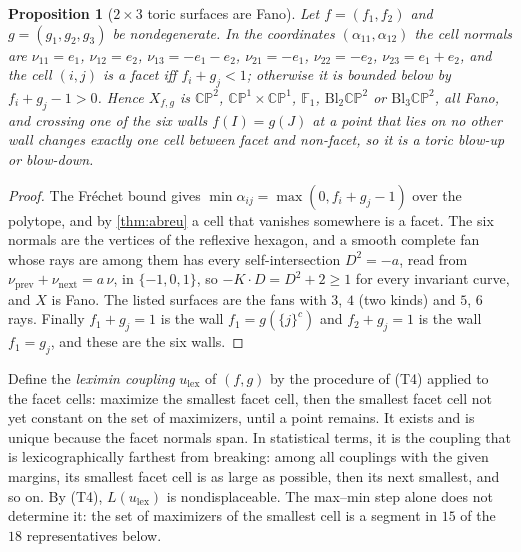 \documentclass[11pt]{article}
\newtheorem{proposition}[theorem]{Proposition}
\theoremstyle{definition}
\theoremstyle{remark}
\begin{document}
\begin{proposition}[$2\times3$ toric surfaces are Fano]\label{prop:fano23}
Let $f=(f_1,f_2)$ and $g=(g_1,g_2,g_3)$ be nondegenerate. In the coordinates $(\alpha_{11},\alpha_{12})$ the cell normals are
$\nu_{11}=e_1$, $\nu_{12}=e_2$, $\nu_{13}=-e_1-e_2$, $\nu_{21}=-e_1$, $\nu_{22}=-e_2$, $\nu_{23}=e_1+e_2$, and the cell $(i,j)$ is a facet iff
$f_i+g_j<1$; otherwise it is bounded below by $f_i+g_j-1>0$. Hence $X_{f,g}$ is $\mathbb{CP}^2$, $\mathbb{CP}^1\times\mathbb{CP}^1$,
$\mathbb F_1$, $\mathrm{Bl}_2\mathbb{CP}^2$ or $\mathrm{Bl}_3\mathbb{CP}^2$, all Fano, and crossing one of the six walls $f(I)=g(J)$ at a point that lies on no other wall changes exactly
one cell between facet and non-facet, so it is a toric blow-up or blow-down.
\end{proposition}
\begin{proof}
The Fréchet bound gives $\min\alpha_{ij}=\max(0,f_i+g_j-1)$ over the polytope, and by \cref{thm:abreu} a cell that vanishes somewhere is a
facet. The six normals are the vertices of the reflexive hexagon, and a smooth complete fan whose rays are among them has every
self-intersection $D^2=-a$, read from $\nu_{\mathrm{prev}}+\nu_{\mathrm{next}}=a\,\nu$, in $\{-1,0,1\}$, so $-K\cdot D=D^2+2\ge1$ for every
invariant curve, and $X$ is Fano. The listed surfaces are the fans with $3$, $4$ (two kinds) and $5$, $6$ rays. Finally $f_1+g_j=1$ is the wall
$f_1=g(\{j\}^c)$ and $f_2+g_j=1$ is the wall $f_1=g_j$, and these are the six walls.
\end{proof}

Define the \emph{leximin coupling} $u_{\mathrm{lex}}$ of $(f,g)$ by the procedure of (T4) applied to the facet cells: maximize the
smallest facet cell, then the smallest facet cell not yet constant on the set of maximizers, until a point remains. It exists and is
unique because the facet normals span. In statistical terms, it is the coupling that is lexicographically farthest from breaking: among all
couplings with the given margins, its smallest facet cell is as large as possible, then its next smallest, and so on. By (T4), $L(u_{\mathrm{lex}})$
is nondisplaceable. The max--min step alone does not determine it: the set of maximizers of the smallest cell is a segment in $15$ of the
$18$ representatives below.
\end{document}
